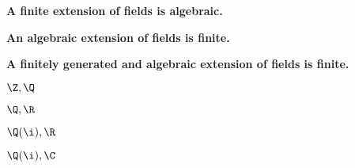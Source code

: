 \textbf{A finite extension of fields is algebraic.}

\textbf{An algebraic extension of fields is finite.}

\textbf{A finitely generated and algebraic extension of fields is finite.}


$\Z, \Q$

$\Q, \R$

$\Q(\i), \R$

$\Q(\i), \C$